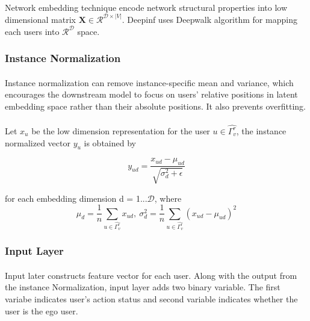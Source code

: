 \paragraph{} Network embedding technique encode network structural properties into low dimensional matrix $\mathbf{X} \in
\mathcal{R}^{\mathcal{D} \times |V|}$. Deepinf uses Deepwalk algorithm for mapping each users into $\mathcal{R}^{\mathcal{D}}$
space.


\subsubsection{Instance Normalization}

\paragraph{} Instance normalization can remove instance-specific mean and variance, which encourages the downstream model 
to focus on users’ relative positions in latent embedding space rather than their absolute positions. It also prevents 
overfitting.

\paragraph{} Let $x_u$ be the low dimension representation for the user $u \in \hat{\Gamma_v^r}$, the instance normalized
vector $y_u$ is obtained by

\begin{equation}
    y_{ud} = \frac{x_{ud}-\mu_{ud}}{\sqrt{\sigma_d^2+\epsilon}}
\end{equation}

for each embedding dimension d = 1...$\mathcal{D}$, where 
\begin{equation}
    \mu_d = \frac{1}{n}\sum_{u \in \hat{\Gamma_v^r}}x_{ud},\ \sigma_d^2 = \frac{1}{n}\sum_{u \in \hat{\Gamma_v^r}}(x_{ud}-\mu_{ud})^2
\end{equation}


\subsubsection{Input Layer}

\paragraph{} Input later constructs feature vector for each user. Along with the output from the instance Normalization,
input layer adds two binary variable. The first variabe indicates user's action status and second variable indicates whether
the user is the ego user.

